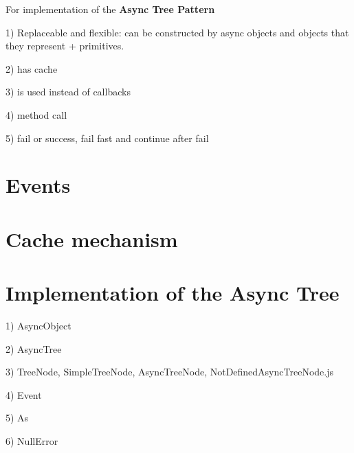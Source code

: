 \documentclass{article}
\begin{document}
For implementation of the \textbf{Async Tree Pattern} 

1) Replaceable and flexible: can be constructed by async objects and objects that they represent + primitives.

2) has cache

3) is used instead of callbacks

4) method call

5) fail or success, fail fast and continue after fail


\section{Events}

\section{Cache mechanism}

\section{Implementation of the Async Tree}

1) AsyncObject

2) AsyncTree

3) TreeNode, SimpleTreeNode, AsyncTreeNode, NotDefinedAsyncTreeNode.js

4) Event

5) As

6) NullError
\end{document}
